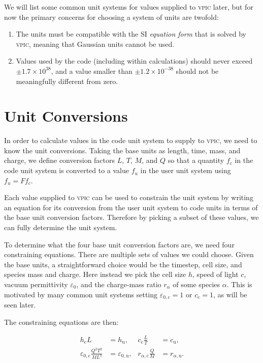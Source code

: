 \documentclass[twocolumn,10pt]{article}
\begin{document}
We will list some common unit systems for values supplied to \textsc{vpic} later, but for now the primary concerns for choosing a system of units are twofold:
\begin{enumerate}
	\item The units must be compatible with the SI \emph{equation form} that is solved by \textsc{vpic}, meaning that Gaussian units cannot be used.
    \item Values used by the code (including within calculations) should never exceed $\pm1.7\times 10^{38}$, and a value smaller than $\pm1.2\times 10^{-38}$ should not be meaningfully different from zero.
\end{enumerate}



\section{Unit Conversions}

In order to calculate values in the code unit system to supply to \textsc{vpic}, we need to know the unit conversions.
Taking the base units as length, time, mass, and charge, we define conversion factors $L$, $T$, $M$, and $Q$ so that a quantity $f_c$ in the code unit system is converted to a value $f_u$ in the user unit system using $f_u = Ff_c$.

Each value supplied to \textsc{vpic} can be used to constrain the unit system by writing an equation for its conversion from the user unit system to code units in terms of the base unit conversion factors.
Therefore by picking a subset of these values, we can fully determine the unit system.

To determine what the four base unit conversion factors are, we need four constraining equations.
There are multiple sets of values we could choose.
Given the base units, a straightforward choice would be the timestep, cell size, and species mass and charge.
Here instead we pick the cell size $h$, speed of light $c$, vacuum permittivity $\varepsilon_0$, and the charge-mass ratio $r_{\alpha}$ of some species $\alpha$.
This is motivated by many common unit systems setting $\varepsilon_{0,\mathrm{c}} = 1$ or $c_{\mathrm{c}} = 1$, as will be seen later.

The constraining equations are then:

\begin{align*}
	h_{\mathrm{c}}L                               &= h_{\mathrm{u}},             &
	c_{\mathrm{c}}\frac{L}{T}                     &= c_{\textrm{u}},             \\
    \varepsilon_{0,\mathrm{c}}\frac{Q^2T^2}{ML^3} &= \varepsilon_{0,\textrm{u}}, &
    r_{\alpha,\mathrm{c}}\frac{Q}{M}              &= r_{\alpha,\textrm{u}}.
\end{align*}
\end{document}

